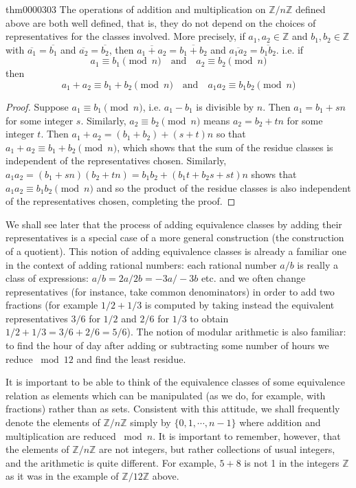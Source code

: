 \documentclass[cn,11pt,chinese]{elegantbook}
\numberwithin{equation}{section}
\begin{document}
\begin{theorem}{}{thm0000303}
The operations of addition and multiplication on $\mathbb{Z}/n\mathbb{Z}$ defined above are both well defined, that is, they do not depend on the choices of representatives for the classes involved. More precisely, if $a_1, a_2 \in \mathbb{Z}$ and $b_1, b_2 \in \mathbb{Z}$ with $\overline{a_1} = \overline{b_1}$ and $\overline{a_2} = \overline{b_2}$, then $\overline{a_1 + a_2} = \overline{b_1+b_2}$ and $\overline{a_1a_2} = \overline{b_1b_2}$. i.e. if
\[
a_1 \equiv b_1 \pmod{n} \quad \text{and}\quad a_2 \equiv b_2 \pmod{n}
\]
then
\[
a_1 + a_2 \equiv b_1 + b_2 \pmod{n} \quad \text{and}\quad a_1a_2 \equiv b_1b_2 \pmod{n}
\]
\end{theorem}

\begin{proof}
Suppose $a_1 \equiv b_1\pmod{n}$, i.e. $a_1-b_1$ is divisible by $n$. Then $a_1 = b_1 + sn$ for some integer $s$. Similarly, $a_2\equiv b_2\pmod{n}$ means $a_2 = b_2 + tn$ for some integer $t$. Then $a_1+a_2 = (b_1+b_2) + (s+t)n$ so that $a_1+a_2 \equiv b_1+b_2 \pmod{n}$, which shows that the sum of the residue classes is independent of the representatives chosen. Similarly, $a_1a_2 = (b_1+sn)(b_2+tn) = b_1b_2 + (b_1t + b_2s + st)n$ shows that $a_1a_2 \equiv b_1b_2 \pmod{n}$ and so the product of the residue classes is also independent of the representatives chosen, completing the proof.
\end{proof}

We shall see later that the process of adding equivalence classes by adding their representatives is a special case of a more general construction (the construction of a quotient). This notion of adding equivalence classes is already a familiar one in the context of adding rational numbers: each rational number $a/b$ is really a class of expressions: $a/b = 2a/2b = -3a/-3b$ etc. and we often change representatives (for instance, take common denominators) in order to add two fractions (for example $1/2 + 1/3$ is computed by taking instead the equivalent representatives $3/6$ for $1/2$ and $2/6$ for $1/3$ to obtain $1/2+1/3=3/6+2/6=5/6$). The notion of modular arithmetic is also familiar: to find the hour of day after adding or subtracting some number of hours we reduce $\bmod{12}$ and find the least residue.

It is important to be able to think of the equivalence classes of some equivalence relation as elements which can be manipulated (as we do, for example, with fractions) rather than as sets. Consistent with this attitude, we shall frequently denote the elements of $\mathbb{Z}/n\mathbb{Z}$ simply by $\{0,1, \cdots, n-1\}$ where addition and multiplication are reduced $\bmod{n}$. It is important to remember, however, that the elements of $\mathbb{Z}/n\mathbb{Z}$ are not integers, but rather collections of usual integers, and the arithmetic is quite different. For example, $5 + 8$ is not 1 in the integers $\mathbb{Z}$ as it was in the example of $\mathbb{Z}/12\mathbb{Z}$ above.
\end{document}
